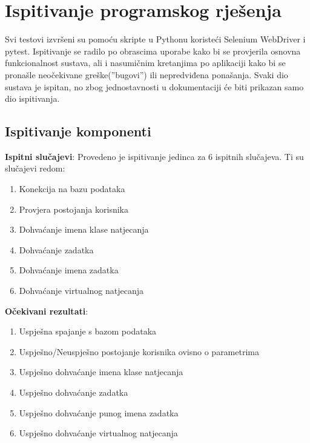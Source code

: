 			
			\eject 
		
	
		\section{Ispitivanje programskog rješenja}
		
			 Svi testovi izvršeni su pomoću skripte u Pythonu koristeći Selenium WebDriver i pytest. Ispitivanje se radilo po obrascima uporabe kako bi se provjerila osnovna funkcionalnost sustava, ali i nasumičnim kretanjima po aplikaciji kako bi se pronašle neočekivane greške(”bugovi”) ili nepredviđena ponašanja. Svaki dio sustava je ispitan, no zbog jednostavnosti u dokumentaciji će biti prikazan samo dio ispitivanja.
	
			
			\subsection{Ispitivanje komponenti}
			\textbf{Ispitni slučajevi}: \newline
			Provedeno je ispitivanje jedinca za 6 ispitnih slučajeva. Ti su slučajevi redom:
			\begin{enumerate}
				\item Konekcija na bazu podataka
				\item Provjera postojanja korisnika
				\item Dohvaćanje imena klase natjecanja
				\item Dohvaćanje zadatka
				\item Dohvaćanje imena zadatka
				\item Dohvaćanje virtualnog natjecanja
			\end{enumerate}
			
			\noindent  \textbf{Očekivani rezultati}: 
			\begin{enumerate}
				\item Uspješna spajanje s bazom podataka
				\item Uspješno/Neuspješno postojanje korisnika ovisno o parametrima
				\item Uspješno dohvaćanje imena klase natjecanja
				\item Uspješno dohvaćanje zadatka
				\item Uspješno dohvaćanje punog imena zadatka
				\item Uspješno dohvaćanje virtualnog natjecanja
			\end{enumerate}
			
